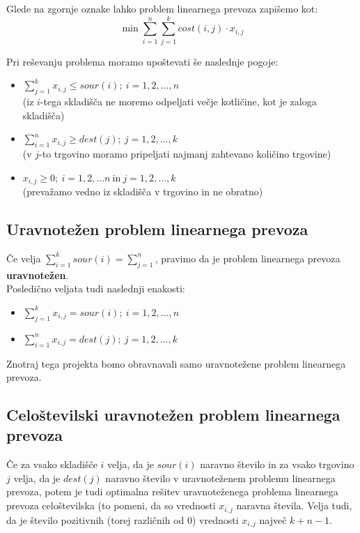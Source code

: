 \documentclass[12pt,a4paper,twoside]{article}
\theoremstyle{definition} %
\theoremstyle{plain} %
\numberwithin{equation}{section}  %
\begin{document}
\noindent Glede na zgornje oznake lahko problem linearnega prevoza zapišemo kot:
$$\min \sum\limits_{i=1}^{n} \sum\limits_{j=1}^{k} cost(i,j) \cdot x_{i,j}$$

\noindent Pri reševanju problema moramo upoštevati še naslednje pogoje:
\begin{itemize}
\item $\sum\limits_{j=1}^{k} x_{i,j} \leq sour(i);~ i=1,2,\dots,n$ \\ (iz $i$-tega skladišča ne moremo odpeljati večje kotličine, kot je zaloga skladišča)
\item $\sum\limits_{i=1}^{n} x_{i,j} \geq dest(j);~ j=1,2,\dots,k$ \\ (v $j$-to trgovino moramo pripeljati najmanj zahtevano količino trgovine)
\item $x_{i,j} \geq 0;~ i=1,2, \dots n ~ \text{in} ~ j=1,2, \dots, k$ \\
(prevažamo vedno iz skladišča v trgovino in ne obratno)
\end{itemize}

\newpage
\subsection{Uravnotežen problem linearnega prevoza}

Če velja $\sum\limits_{i=1}^{k} sour(i) = \sum\limits_{j=1}^{n}$, pravimo da je problem linearnega prevoza \textbf{uravnotežen}. \\

\noindent Posledično veljata tudi naslednji enakosti:
\begin{itemize}
\item $\sum\limits_{j=1}^{k} x_{i,j} = sour(i);~ i=1,2,\dots,n$ 
\item $\sum\limits_{i=1}^{n} x_{i,j} = dest(j);~ j=1,2,\dots,k$
\end{itemize}

 \noindent Znotraj tega projekta bomo obravnavali samo uravnotežene problem linearnega prevoza.

\subsection{Celoštevilski uravnotežen problem linearnega prevoza}

Če za vsako skladišče $i$ velja, da je $sour(i)$ naravno število in za vsako trgovino $j$ velja, da je $dest(j)$ naravno število v uravnoteženem problemu linearnega prevoza, potem je tudi optimalna rešitev uravnoteženega problema linearnega prevoza celoštevilska (to pomeni, da so vrednosti $x_{i,j}$ naravna števila. Velja tudi, da je število pozitivnih (torej različnih od $0$) vrednosti $x_{i,j}$ največ $k+n-1$.
\end{document}
